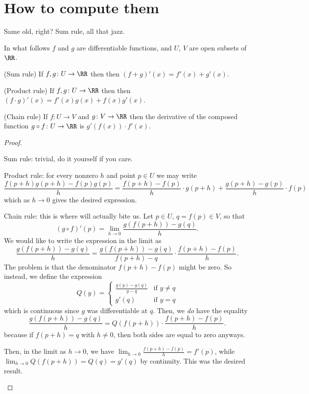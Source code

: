 \section{How to compute them}
Same old, right?
Sum rule, all that jazz.

\begin{theorem}
	In what follows $f$ and $g$ are differentiable functions,
	and $U$, $V$ are open subsets of $\RR$.
	\begin{itemize}
		\ii (Sum rule) If $f,g \colon U \to \RR$ then
		then $(f+g)'(x) = f'(x) + g'(x)$.

		\ii (Product rule) If $f,g \colon U \to \RR$ then
		then $(f \cdot g)'(x) = f'(x) g(x) + f(x) g'(x)$.

		\ii (Chain rule) If $f \colon U \to V$ and $g \colon V \to \RR$
		then the derivative of the composed function
		$g \circ f \colon U \to \RR$ is $g'(f(x)) \cdot f'(x)$.
	\end{itemize}
\end{theorem}
\begin{proof}
	\begin{itemize}
	\ii Sum rule: trivial, do it yourself if you care.

	\ii Product rule: for every nonzero $h$ and point $p \in U$
	we may write
	\[
		\frac{f(p+h) g(p+h) - f(p) g(p)}{h}
		= \frac{f(p+h) - f(p)}{h} \cdot g(p+h)
		+ \frac{g(p+h)-g(p)}{h} \cdot f(p)
	\]
	which as $h \to 0$ gives the desired expression.

	\ii Chain rule: this is where \Cref{abuse:limit}
	will actually bite us.
	Let $p \in U$, $q = f(p) \in V$, so that
	\[ (g \circ f)'(p) = \lim_{h \to 0} \frac{g(f(p+h)) - g(q)}{h}. \]
	We would like to write the expression in the limit as
	\[ \frac{g(f(p+h)) - g(q)}{h}
		= \frac{g(f(p+h)) - g(q)}{f(p+h) - q}
		\cdot \frac{f(p+h) - f(p)}{h}. \]
	The problem is that the denominator $f(p+h)-f(p)$ might be zero.
	So instead, we define the expression
	\[
		Q(y) = \begin{cases}
			\frac{g(y) - g(q)}{y - q} & \text{if } y \neq q \\
			g'(q) & \text{if } y = q
		\end{cases}
	\]
	which is continuous since $g$ was differentiable at $q$.
	Then, we \emph{do} have the equality
	\[ \frac{g(f(p+h)) - g(q)}{h}
		= Q\left( f(p+h) \right) \cdot \frac{f(p+h) - f(p)}{h}. \]
	because if $f(p+h) = q$ with $h \neq 0$,
	then both sides are equal to zero anyways.

	Then, in the limit as $h \to 0$,
	we have $\lim_{h \to 0} \frac{f(p+h)-f(p)}{h} = f'(p)$,
	while $\lim_{h \to 0} Q(f(p+h)) = Q(q) = g'(q)$ by continuity.
	This was the desired result. \qedhere
	\end{itemize}
\end{proof}

